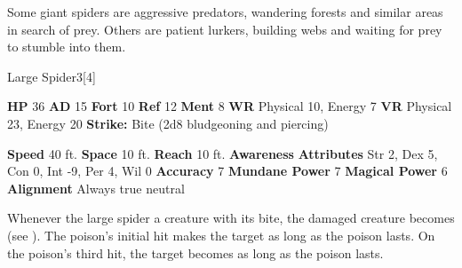       Some giant spiders are aggressive predators, wandering forests and similar areas in search of prey.
      Others are patient lurkers, building webs and waiting for prey to stumble into them.
    

      
  \begin{monsubsection}{Large Spider}{3}[4]
    \vspace{-1em}\vspace{-1em}
    \vspace{0em}

    
    

    \begin{spellcontent}
      \begin{spelltargetinginfo}
        \pari \textbf{HP} 36 \monsep
          \textbf{AD} 15 \monsep
          \textbf{Fort} 10 \monsep
          \textbf{Ref} 12 \monsep
          \textbf{Ment} 8
        \pari \textbf{WR} Physical 10, Energy 7 \monsep
        \textbf{VR} Physical 23, Energy 20
        \pari \textbf{Strike:}
            Bite  (2d8 bludgeoning and piercing)
      \end{spelltargetinginfo}
    \end{spellcontent}
    \begin{monsterfooter}
      \pari \textbf{Speed} 40 ft. \monsep
        \textbf{Space} 10 ft. \monsep
        \textbf{Reach} 10 ft.
      \pari \textbf{Awareness} 
      \pari \textbf{Attributes}
        Str 2, Dex 5,
        Con 0, Int -9,
        Per 4, Wil 0
      \pari \textbf{Accuracy} 7 \monsep
        \textbf{Mundane Power} 7 \monsep
      \textbf{Magical Power} 6
      \pari \textbf{Alignment} Always true neutral
    \end{monsterfooter}
  \end{monsubsection}
        Whenever the large spider  a creature with its bite,
          the damaged creature becomes  (see ).
        The poison's initial hit makes the target  as long as the poison lasts.
        On the poison's third hit, the target becomes  as long as the poison lasts.
  

